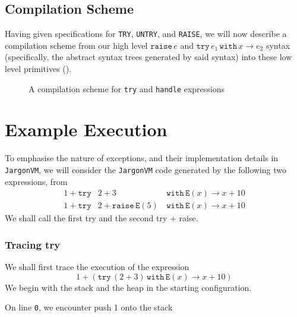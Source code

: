 \subsection{Compilation Scheme}
Having given specifications for \texttt{TRY}, \texttt{UNTRY}, and \texttt{RAISE}, we will now describe a compilation scheme from our high level $\texttt{raise} \, e$ and $\texttt{try} \, e_1 \, \texttt{with} \, x \to e_2$ syntax (specifically, the abstract syntax trees generated by said syntax) into these low level primitives (). 

\begin{figure}[H]
    \centering
    \caption{A compilation scheme for \texttt{try} and \texttt{handle} expressions}
    \label{fig:exception-compilation-scheme}
\end{figure}

\section{Example Execution}
To emphasise the nature of exceptions, and their implementation details in \texttt{JargonVM}, we will consider the \texttt{JargonVM} code generated by the following two expressions, from 
\[\begin{array}{rrc}
     1+\texttt{try}& 2+3\, & \texttt{with} \, \texttt{E}(x) \to x+10  \\
     1+\texttt{try}& 2+\texttt{raise}\, \texttt{E}(5)\, & \texttt{with} \, \texttt{E}(x) \to x+10
\end{array} \]
We shall call the first \textsf{try} and the second \textsf{try + raise}.

\subsubsection{Tracing try}
We shall first trace the execution of the expression
\[ 1+(\texttt{try} \, (2+3)\, \texttt{with} \, \texttt{E}(x) \to x+10)\]
We begin with the stack and the heap in the starting configuration.
\begin{center}
\end{center}

On line \texttt{0}, we encounter push 1 onto the stack
\begin{center}
\end{center}

